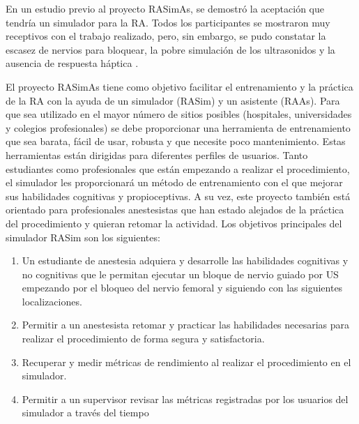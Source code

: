 En un estudio previo al proyecto \ac{RASimAs}, se demostró la aceptación que tendría un simulador para la \ac{RA}. Todos los participantes se mostraron muy receptivos con el trabajo realizado, pero, sin embargo, se pudo constatar la escasez de nervios para bloquear, la pobre simulación de los ultrasonidos y la ausencia de respuesta háptica \cite{Grottke2009594}.





El proyecto \ac{RASimAs} tiene como objetivo  facilitar el entrenamiento y la práctica de la \ac{RA} con la ayuda de un simulador (\ac{RASim}) y un asistente (\ac{RAAs}).
Para que sea utilizado en el mayor número de sitios posibles (hospitales, universidades y colegios profesionales) se debe proporcionar una herramienta de entrenamiento que sea barata, fácil de usar, robusta y que necesite poco mantenimiento.
Estas herramientas están dirigidas para diferentes perfiles de usuarios.  Tanto estudiantes como profesionales que están empezando a realizar el procedimiento, el simulador les proporcionará un método de entrenamiento con el que mejorar sus habilidades cognitivas y propioceptivas. A su vez, este proyecto también está orientado para profesionales anestesistas que han estado alejados de la práctica del procedimiento y quieran retomar la actividad.
Los objetivos principales del simulador \ac{RASim} son los siguientes:
\begin{enumerate}
    \item Un estudiante de anestesia adquiera y desarrolle las habilidades cognitivas y no cognitivas que le permitan ejecutar un bloque de nervio guiado por \ac{US} empezando por el bloqueo del nervio femoral y siguiendo con las siguientes localizaciones.
    \item Permitir a un anestesista retomar y practicar las habilidades necesarias para realizar el procedimiento de forma segura y satisfactoria.
    \item Recuperar y medir métricas de rendimiento al realizar el procedimiento en el simulador. 
    \item Permitir a un supervisor revisar las métricas registradas por los usuarios del simulador a través del tiempo
\end{enumerate}









